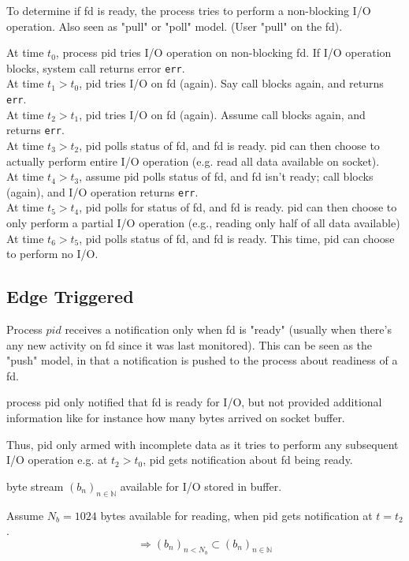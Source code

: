 \documentclass[10pt]{amsart}
\begin{document}
\begin{multicols*}{2}
To determine if fd is ready, the process tries to perform a non-blocking I/O operation. Also seen as "pull" or "poll" model. (User "pull" on the fd).

At time $t_0$, process pid tries I/O operation on non-blocking fd. If I/O operation blocks, system call returns error \texttt{err}. \\
At time $t_1 > t_0$, pid tries I/O on fd (again). Say call blocks again, and returns \texttt{err}. \\
At time $t_2 > t_1$, pid tries I/O on fd (again). Assume call blocks again, and returns \texttt{err}. \\
At time $t_3 > t_2$, pid polls status of fd, and fd is ready. pid can then choose to actually perform entire I/O operation (e.g. read all data available on socket). \\
At time $t_4 > t_3$, assume pid polls status of fd, and fd isn't ready; call blocks (again), and I/O operation returns \texttt{err}. \\
At time $t_5 > t_4$, pid polls for status of fd, and fd is ready. pid can then choose to only perform a partial I/O operation (e.g., reading only half of all data available) \\
At time $t_6 > t_5$, pid polls status of fd, and fd is ready. This time, pid can choose to perform no I/O.

\subsection{Edge Triggered}

Process $pid$ receives a notification only when fd is "ready" (usually when there's any new activity on fd since it was last monitored). This can be seen as the "push" model, in that a notification is pushed to the process about readiness of a fd.

process pid only notified that fd is ready for I/O, but not provided additional information like for instance how many bytes arrived on socket buffer.

Thus, pid only armed with incomplete data as it tries to perform any subsequent I/O operation 
e.g. 
 at $t_2 > t_0$, pid gets notification about fd being ready.
 
 byte stream $(b_n)_{n\in \mathbb{N}}$ available for I/O stored in buffer.
 
 Assume $N_b = 1024$ bytes available for reading, when pid gets notification at $t= t_2$. 
 \[
 \Longrightarrow (b_n)_{n <N_b} \subset (b_n)_{n\in \mathbb{N}}
 \]
 

\end{multicols*}
\end{document}
